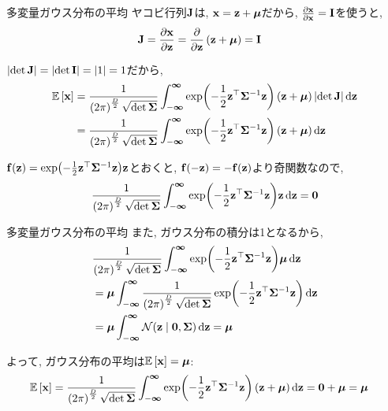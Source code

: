 \documentclass[dvipdfmx,notheorems,t]{beamer}
\begin{document}
\begin{frame}{多変量ガウス分布の平均}
ヤコビ行列$\vb{J}$は, $\vb{x} = \vb{z} + \vb*{\mu}$だから, $\pdv{\vb{x}}{\vb{x}} = \vb{I}$を使うと,
\begin{align*}
  \vb{J} &= \pdv{\vb{x}}{\vb{z}} = \pdv{\vb{z}} \left( \vb{z} + \vb*{\mu} \right) = \vb{I}
\end{align*}

$\left| \det \vb{J} \right| = \left| \det \vb{I} \right| = \left| 1 \right| = 1$だから,
{\small \begin{align*}
  \operatorname{\mathbb{E}} \left[ \vb{x} \right] &= \frac{1}{\left( 2\pi \right)^\frac{D}{2} \sqrt{\det \vb{\Sigma}}}
    \int_{-\boldsymbol{\infty}}^{\boldsymbol{\infty}}
    \exp(-\frac{1}{2} \vb{z}^\top \vb{\Sigma}^{-1} \vb{z}) \left( \vb{z} + \vb*{\mu} \right)
    \left| \det \vb{J} \right| \dd{\vb{z}} \\
    &= \frac{1}{\left( 2\pi \right)^\frac{D}{2} \sqrt{\det \vb{\Sigma}}}
    \int_{-\boldsymbol{\infty}}^{\boldsymbol{\infty}}
    \exp(-\frac{1}{2} \vb{z}^\top \vb{\Sigma}^{-1} \vb{z}) \left( \vb{z} + \vb*{\mu} \right)
    \dd{\vb{z}}
\end{align*}}

$\vb{f}(\vb{z}) = \exp(-\frac{1}{2} \vb{z}^\top \vb{\Sigma}^{-1} \vb{z}) \vb{z}$とおくと,
$\vb{f}(-\vb{z}) = -\vb{f}(\vb{z})$より奇関数なので,
\begin{align*}
  \frac{1}{\left( 2\pi \right)^\frac{D}{2} \sqrt{\det \vb{\Sigma}}}
  \int_{-\boldsymbol{\infty}}^{\boldsymbol{\infty}}
    \exp(-\frac{1}{2} \vb{z}^\top \vb{\Sigma}^{-1} \vb{z}) \vb{z} \dd{\vb{z}} = \vb{0}
\end{align*}
\end{frame}

\begin{frame}{多変量ガウス分布の平均}
また, ガウス分布の積分は1となるから,
\begin{align*}
  & \frac{1}{\left( 2\pi \right)^\frac{D}{2} \sqrt{\det \vb{\Sigma}}}
  \int_{-\boldsymbol{\infty}}^{\boldsymbol{\infty}}
    \exp(-\frac{1}{2} \vb{z}^\top \vb{\Sigma}^{-1} \vb{z}) \vb*{\mu} \dd{\vb{z}} \\
  &= \vb*{\mu} \int_{-\boldsymbol{\infty}}^{\boldsymbol{\infty}}
    \frac{1}{\left( 2\pi \right)^\frac{D}{2} \sqrt{\det \vb{\Sigma}}}
    \exp(-\frac{1}{2} \vb{z}^\top \vb{\Sigma}^{-1} \vb{z}) \dd{\vb{z}} \\
  &= \vb*{\mu} \int_{-\boldsymbol{\infty}}^{\boldsymbol{\infty}}
    \mathcal{N}(\vb{z} \mid \vb{0}, \vb{\Sigma}) \dd{\vb{z}} = \vb*{\mu}
\end{align*}

よって, ガウス分布の平均は$\operatorname{\mathbb{E}} \left[ \vb{x} \right] = \vb*{\mu}$:
\begin{align*}
  \operatorname{\mathbb{E}} \left[ \vb{x} \right] &= \frac{1}{\left( 2\pi \right)^\frac{D}{2} \sqrt{\det \vb{\Sigma}}}
    \int_{-\boldsymbol{\infty}}^{\boldsymbol{\infty}}
    \exp(-\frac{1}{2} \vb{z}^\top \vb{\Sigma}^{-1} \vb{z}) \left( \vb{z} + \vb*{\mu} \right)
    \dd{\vb{z}} = \vb{0} + \vb*{\mu} = \vb*{\mu}
\end{align*}
\end{frame}
\end{document}
